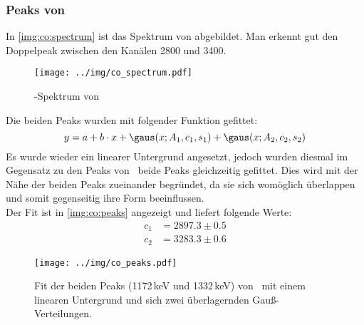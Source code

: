 \subsubsection{Peaks von \co}
\label{subsub:eval:co}
In \autoref{img:co:spectrum} ist das Spektrum von \co abgebildet. Man erkennt gut den Doppelpeak zwischen den Kanälen 2800 und 3400.
\begin{figure}[H]
\begin{center}
  \texttt{[image: ../img/co\_spectrum.pdf]}
  \caption{\textgamma-Spektrum von }
  \label{img:co:spectrum}
\end{center}
\end{figure}
Die beiden Peaks wurden mit folgender Funktion gefittet:
\begin{equation}
  y = a + b\cdot x + \gaus(x; A_1, c_1, s_1) + \gaus(x; A_2, c_2, s_2)
\end{equation}
Es wurde wieder ein linearer Untergrund angesetzt, jedoch wurden diesmal im Gegensatz zu den Peaks von \na\, beide Peaks gleichzeitig gefittet. 
Dies wird mit der Nähe der beiden Peaks zueinander begründet, da sie sich womöglich überlappen und somit gegenseitig ihre Form beeinflussen.\\
Der Fit ist in \autoref{img:co:peaks} angezeigt und liefert folgende Werte:
\begin{equation}
\begin{split}
  \label{eq:co:channels}
  c_1 &= 2897.3 \pm 0.5 \\
  c_2 &= 3283.3 \pm 0.6
\end{split}
\end{equation}
\begin{figure}[H]
\begin{center}
  \texttt{[image: ../img/co\_peaks.pdf]}
  \caption{Fit der beiden Peaks (1172\,keV und 1332\,keV) von \co\, mit einem linearen Untergrund und sich zwei überlagernden Gauß-Verteilungen.}
  \label{img:co:peaks}
\end{center}
\end{figure}

